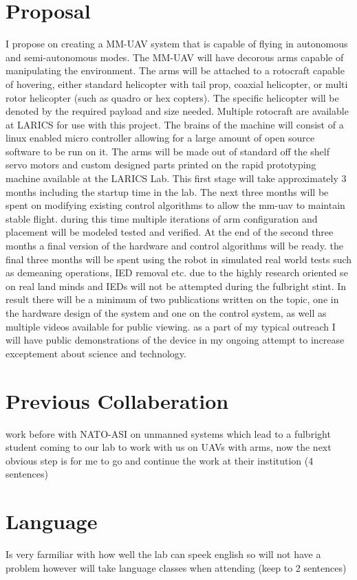 \documentclass[12pt]{article}
\begin{document}
\section{Proposal}
I propose on creating a MM-UAV system that is capable of flying in autonomous and semi-autonomous 
modes.  The MM-UAV will have decorous arms capable of manipulating the environment.  The arms 
will be attached to a rotocraft capable of hovering, either standard helicopter with tail prop, coaxial 
helicopter, or multi rotor helicopter (such as quadro or hex copters).  The specific helicopter will be 
denoted by the required payload and size needed.  Multiple rotocraft are available at LARICS for use 
with this project.  The brains of the machine will consist of a linux enabled micro controller allowing for 
a large amount of open source software to be run on it.  The arms will be made out of standard off the 
shelf servo motors and custom designed parts printed on the rapid prototyping machine available at 
the LARICS Lab.  This first stage will take approximately 3 months including the startup time in the lab.  
The next three months will be spent on modifying existing control algorithms to allow the mm-uav to 
maintain stable flight.  during this time multiple iterations of arm configuration and placement will be 
modeled tested and verified.  At the end of the second three months a final version of the hardware and 
control algorithms will be ready.  the final three months will be spent using the robot in simulated real 
world tests such as demeaning operations, IED removal etc.  due to the highly research oriented se on 
real land minds and IEDs will not be attempted during the fulbright stint.  In result there will be a 
minimum of two publications written on the topic, one in the hardware design of the system and one on 
the control system, as well as multiple videos available for public viewing.  as a part of my typical 
outreach I will have public demonstrations of the device in my ongoing attempt to increase 
exceptement about science and technology.  

\section{Previous Collaberation}
work before with NATO-ASI on unmanned systems which lead to a fulbright student coming to our lab 
to work with us on UAVs with arms, now the next obvious step is for me to go and continue the work at 
their institution (4 sentences)

\section{Language}
Is very farmiliar with how well the lab can speek english so will not have a problem however will take 
language classes when attending (keep to 2 sentences)
\end{document}
